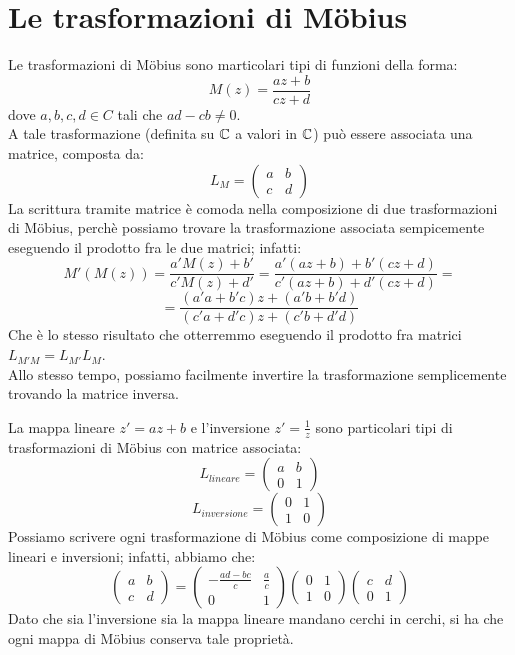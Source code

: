 \chapter{Le trasformazioni di M\"{o}bius}

Le trasformazioni di M\"{o}bius sono marticolari tipi di funzioni della forma:
\begin{equation}
M(z)=\frac{az+b}{cz+d}
\end{equation}
dove $a,b,c,d\in C$ tali che $ad-cb \neq 0$.
\\A tale trasformazione (definita su $\mathbb{C}$ a valori in $\mathbb{C}$) può essere associata una matrice, composta da:
\[
L_M =
\begin{pmatrix}
a	&b\\
c	&d
\end{pmatrix}
\]                                  
La scrittura tramite matrice è comoda nella composizione di due trasformazioni di M\"{o}bius, perchè possiamo trovare la trasformazione associata sempicemente eseguendo il prodotto fra le due matrici; infatti:
$$M'(M(z))=\frac{a'M(z) + b'}{c'M(z) + d'}=\frac{a'(az+b)+b'(cz+d)}{c'(az+b)+d'(cz+d)}=$$
$$=\frac{(a'a+b'c)z+(a'b+b'd)}{(c'a+d'c)z+(c'b+d'd)}$$
Che è lo stesso risultato che otterremmo eseguendo il prodotto fra matrici $L_{M'M}=L_{M'}L_M$.
\\Allo stesso tempo, possiamo facilmente invertire la trasformazione semplicemente trovando la matrice inversa.
 
La mappa lineare $z'=az+b$ e l'inversione $z'=\frac{1}{z}$ sono particolari tipi di trasformazioni di M\"{o}bius con matrice associata:
\[
L_{lineare} =
\begin{pmatrix}
a	&b\\
0	&1
\end{pmatrix}
\]
\[
L_{inversione} =
\begin{pmatrix}
0	&1\\
1	&0
\end{pmatrix}
\]
Possiamo scrivere ogni trasformazione di M\"{o}bius come composizione di mappe lineari e inversioni; infatti, abbiamo che:
\[
\begin{pmatrix}a&b\\c&d\end{pmatrix} = \begin{pmatrix}-\frac{ad-bc}{c}&\frac{a}{c}\\0&1\end{pmatrix}\begin{pmatrix}0&1\\1&0\end{pmatrix}\begin{pmatrix}c&d\\0&1\end{pmatrix}
\]
Dato che sia l'inversione sia la mappa lineare mandano cerchi in cerchi, si ha che ogni mappa di M\"{o}bius conserva tale proprietà.

